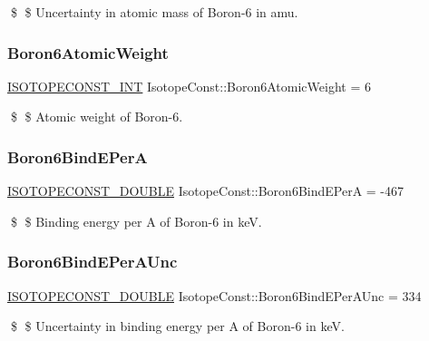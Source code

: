 \$ \$ Uncertainty in atomic mass of Boron-\/6 in amu. \mbox{\label{group___isotope_const-_boron-_b6_gaeb620c263dbb9c36c8a6edd8ff32da41}} 
\subsubsection{\texorpdfstring{Boron6\+Atomic\+Weight}{Boron6AtomicWeight}}
{\footnotesize\ttfamily \mbox{\hyperlink{group___isotope_const-_macros_ga5f18360b3e99483a35c32d789e62621c}{I\+S\+O\+T\+O\+P\+E\+C\+O\+N\+S\+T\+\_\+\+I\+NT}} Isotope\+Const\+::\+Boron6\+Atomic\+Weight = 6}

\$ \$ Atomic weight of Boron-\/6. \mbox{\label{group___isotope_const-_boron-_b6_gab99728bfe442fabfe30ac7b047e2be8e}} 
\subsubsection{\texorpdfstring{Boron6\+Bind\+E\+PerA}{Boron6BindEPerA}}
{\footnotesize\ttfamily \mbox{\hyperlink{group___isotope_const-_macros_ga8f45a7272ce02c0b4c65c44636ed719a}{I\+S\+O\+T\+O\+P\+E\+C\+O\+N\+S\+T\+\_\+\+D\+O\+U\+B\+LE}} Isotope\+Const\+::\+Boron6\+Bind\+E\+PerA = -\/467}

\$ \$ Binding energy per A of Boron-\/6 in keV. \mbox{\label{group___isotope_const-_boron-_b6_gabe76b4884683f5e97c7b62ca446decb3}} 
\subsubsection{\texorpdfstring{Boron6\+Bind\+E\+Per\+A\+Unc}{Boron6BindEPerAUnc}}
{\footnotesize\ttfamily \mbox{\hyperlink{group___isotope_const-_macros_ga8f45a7272ce02c0b4c65c44636ed719a}{I\+S\+O\+T\+O\+P\+E\+C\+O\+N\+S\+T\+\_\+\+D\+O\+U\+B\+LE}} Isotope\+Const\+::\+Boron6\+Bind\+E\+Per\+A\+Unc = 334}

\$ \$ Uncertainty in binding energy per A of Boron-\/6 in keV. \mbox{\label{group___isotope_const-_boron-_b6_ga03a13cf0900863afb4fbff7b2b734d06}} 
